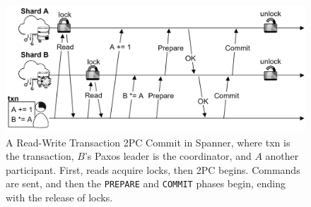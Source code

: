 \begin{figure}[ht!]
    \centering
    \includegraphics[width=\textwidth]{Sections/span/rw.png}
    \caption{A Read-Write Transaction 2PC Commit in Spanner, where txn is the transaction, $B$'s Paxos leader is the coordinator, and $A$ another participant. First, reads acquire locks, then 2PC begins.
    Commands are sent, and then the \texttt{PREPARE} and \texttt{COMMIT} phases begin, ending with the release of locks.}

\end{figure}

\newpage 



